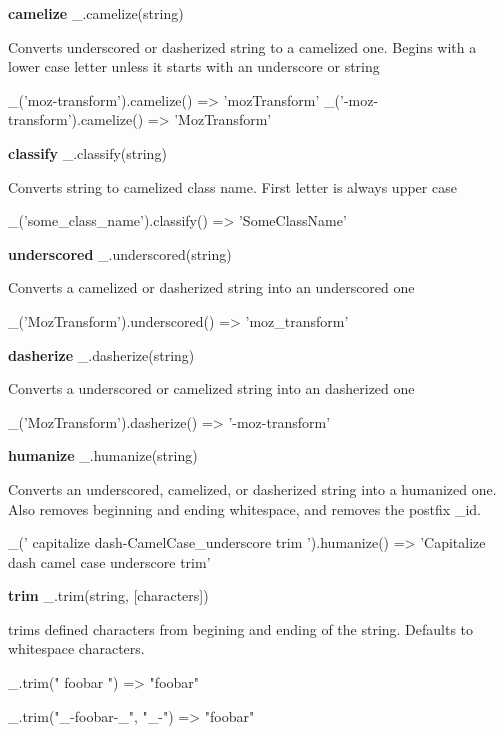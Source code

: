 {\bfseries camelize} \+\_\+.\+camelize(string)

Converts underscored or dasherized string to a camelized one. Begins with a lower case letter unless it starts with an underscore or string


\begin{DoxyCode}
\_('moz-transform').camelize()
=> 'mozTransform'
\_('-moz-transform').camelize()
=> 'MozTransform'
\end{DoxyCode}


{\bfseries classify} \+\_\+.\+classify(string)

Converts string to camelized class name. First letter is always upper case


\begin{DoxyCode}
\_('some\_class\_name').classify()
=> 'SomeClassName'
\end{DoxyCode}


{\bfseries underscored} \+\_\+.\+underscored(string)

Converts a camelized or dasherized string into an underscored one


\begin{DoxyCode}
\_('MozTransform').underscored()
=> 'moz\_transform'
\end{DoxyCode}


{\bfseries dasherize} \+\_\+.\+dasherize(string)

Converts a underscored or camelized string into an dasherized one


\begin{DoxyCode}
\_('MozTransform').dasherize()
=> '-moz-transform'
\end{DoxyCode}


{\bfseries humanize} \+\_\+.\+humanize(string)

Converts an underscored, camelized, or dasherized string into a humanized one. Also removes beginning and ending whitespace, and removes the postfix \textquotesingle{}\+\_\+id\textquotesingle{}.


\begin{DoxyCode}
\_('  capitalize dash-CamelCase\_underscore trim  ').humanize()
=> 'Capitalize dash camel case underscore trim'
\end{DoxyCode}


{\bfseries trim} \+\_\+.\+trim(string, \mbox{[}characters\mbox{]})

trims defined characters from begining and ending of the string. Defaults to whitespace characters.


\begin{DoxyCode}
\_.trim("  foobar   ")
=> "foobar"

\_.trim("\_-foobar-\_", "\_-")
=> "foobar"
\end{DoxyCode}


